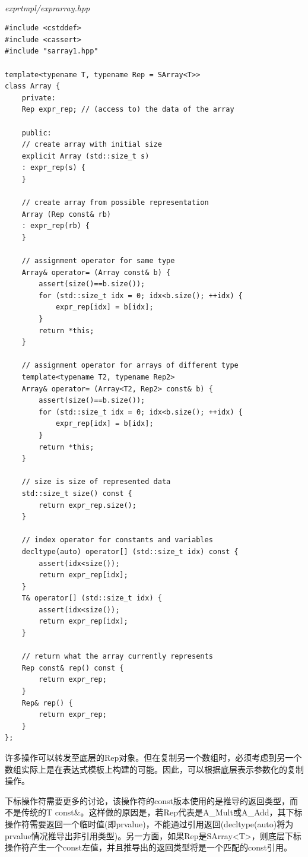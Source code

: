\hspace*{\fill} \\ %
\noindent
\textit{exprtmpl/exprarray.hpp}
\begin{lstlisting}[style=styleCXX]
#include <cstddef>
#include <cassert>
#include "sarray1.hpp"

template<typename T, typename Rep = SArray<T>>
class Array {
	private:
	Rep expr_rep; // (access to) the data of the array
	
	public:
	// create array with initial size
	explicit Array (std::size_t s)
	: expr_rep(s) {
	}

	// create array from possible representation
	Array (Rep const& rb)
	: expr_rep(rb) {
	}

	// assignment operator for same type
	Array& operator= (Array const& b) {
		assert(size()==b.size());
		for (std::size_t idx = 0; idx<b.size(); ++idx) {
			expr_rep[idx] = b[idx];
		}
		return *this;
	}

	// assignment operator for arrays of different type
	template<typename T2, typename Rep2>
	Array& operator= (Array<T2, Rep2> const& b) {
		assert(size()==b.size());
		for (std::size_t idx = 0; idx<b.size(); ++idx) {
			expr_rep[idx] = b[idx];
		}
		return *this;
	}

	// size is size of represented data
	std::size_t size() const {
		return expr_rep.size();
	}

	// index operator for constants and variables
	decltype(auto) operator[] (std::size_t idx) const {
		assert(idx<size());
		return expr_rep[idx];
	}
	T& operator[] (std::size_t idx) {
		assert(idx<size());
		return expr_rep[idx];
	}

	// return what the array currently represents
	Rep const& rep() const {
		return expr_rep;
	}
	Rep& rep() {
		return expr_rep;
	}
};
\end{lstlisting}

许多操作可以转发至底层的Rep对象。但在复制另一个数组时，必须考虑到另一个数组实际上是在表达式模板上构建的可能。因此，可以根据底层表示参数化的复制操作。

下标操作符需要更多的讨论，该操作符的const版本使用的是推导的返回类型，而不是传统的T const\&。这样做的原因是，若Rep代表是A\_Mult或A\_Add，其下标操作符需要返回一个临时值(即prvalue)，不能通过引用返回(decltype(auto)将为prvalue情况推导出非引用类型)。另一方面，如果Rep是SArray<T>，则底层下标操作符产生一个const左值，并且推导出的返回类型将是一个匹配的const引用。


